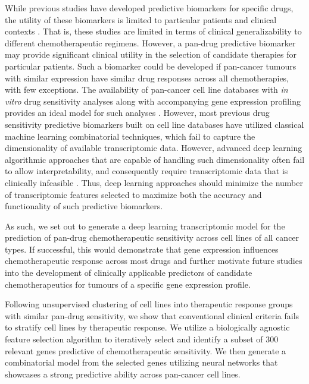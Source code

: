 \documentclass[10pt, letterpaper]{article}
\begin{document}
\begin{multicols*}{2}
While previous studies have developed predictive biomarkers for specific drugs, the utility of these biomarkers is limited to particular patients and clinical contexts \cite{drug_sense}. That is, these studies are limited in terms of clinical generalizability to different chemotherapeutic regimens. However, a pan-drug predictive biomarker may provide significant clinical utility in the selection of candidate therapies for particular patients. Such a biomarker could be developed if pan-cancer tumours with similar expression have similar drug responses across all chemotherapies, with few exceptions. The availability of pan-cancer cell line databases with \textit{in vitro} drug sensitivity analyses along with accompanying gene expression profiling provides an ideal model for such analyses \cite{gdsc}. However, most previous drug sensitivity predictive biomarkers built on cell line databases have utilized classical machine learning combinatorial techniques, which fail to capture the dimensionality of available transcriptomic data. However, advanced deep learning algorithmic approaches that are capable of handling such dimensionality often fail to allow interpretability, and consequently require transcriptomic data that is clinically infeasible \cite{ml_oncol}. Thus, deep learning approaches should minimize the number of transcriptomic features selected to maximize both the accuracy and functionality of such predictive biomarkers.

As such, we set out to generate a deep learning transcriptomic model for the prediction of pan-drug chemotherapeutic sensitivity across cell lines of all cancer types. If successful, this would demonstrate that gene expression influences chemotherapeutic response across most drugs and further motivate future studies into the development of clinically applicable predictors of candidate chemotherapeutics for tumours of a specific gene expression profile.

Following unsupervised clustering of cell lines into therapeutic response groups with similar pan-drug sensitivity, we show that conventional clinical criteria fails to stratify cell lines by therapeutic response. We utilize a biologically agnostic feature selection algorithm to iteratively select and identify a subset of 300 relevant genes predictive of chemotherapeutic sensitivity. We then generate a combinatorial model from the selected genes utilizing neural networks that showcases a strong predictive ability across pan-cancer cell lines.



\end{multicols*}
\end{document}
